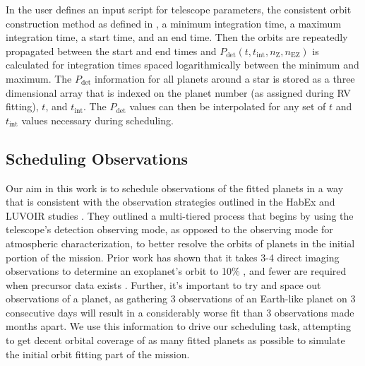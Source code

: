 
In  the user defines an  input script for
telescope parameters, the consistent orbit construction method as defined in
, a minimum integration time, a maximum integration time,
a start time, and an end time. Then the orbits are repeatedly propagated
between the start and end times and $P_{\textrm{det}}(t, t_{\textrm{int}},
n_\textrm{Z}, n_\textrm{EZ})$ is calculated for integration times spaced
logarithmically between the minimum and maximum. The $P_{\textrm{det}}$
information for all planets around a star is stored as a three dimensional
array that is indexed on the planet number (as assigned during RV fitting),
$t$, and $t_{\textrm{int}}$. The $P_\textrm{det}$ values can then be
interpolated for any set of $t$ and $t_\textrm{int}$ values necessary during
scheduling.

\subsection{Scheduling Observations}
\label{sub:scheduling}

Our aim in this work is to schedule observations of the fitted planets in a way
that is consistent with the observation strategies outlined in the HabEx and
LUVOIR studies \cite{gaudiHabitableExoplanetObservatory2020,TheLUVOIRTeam2019}.
They outlined a multi-tiered process that begins by using the telescope's
detection observing mode, as opposed to the observing mode for atmospheric
characterization, to better resolve the orbits of planets in the initial
portion of the mission. Prior work has shown that it takes 3-4 direct imaging
observations to determine an exoplanet's orbit to 10\%
\citep{bluntOrbitsImpatient2017}, and fewer are required when precursor data
exists \citep{gaudiHabitableExoplanetObservatory2020}. Further, it's important
to try and space out observations of a planet, as gathering 3 observations of
an Earth-like planet on 3 consecutive days will result in a considerably worse
fit than 3 observations made months apart. We use this information to drive our
scheduling task, attempting to get decent orbital coverage of as many fitted
planets as possible to simulate the initial orbit fitting part of the mission.


